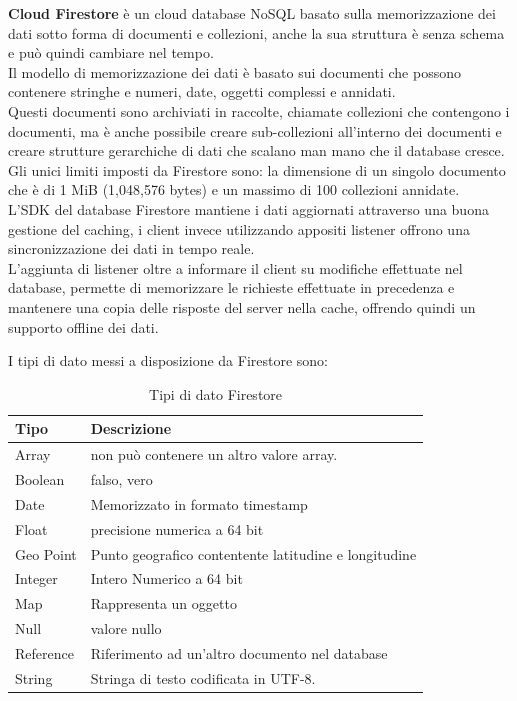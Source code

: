 \textbf{Cloud Firestore} è un cloud database NoSQL basato sulla memorizzazione dei dati sotto forma di documenti e collezioni, anche la sua struttura è senza schema e può quindi cambiare nel tempo.\\
Il modello di memorizzazione dei dati è basato sui documenti che possono contenere  stringhe e numeri, date, oggetti complessi e annidati.\\
Questi documenti sono archiviati in raccolte, chiamate collezioni che contengono i documenti, ma è anche possibile creare sub-collezioni all'interno dei documenti e creare strutture gerarchiche di dati che scalano man mano che il database cresce.\\
Gli unici limiti imposti da Firestore sono: la dimensione di un singolo documento che è di 1 MiB (1,048,576 bytes) e un massimo di 100 collezioni annidate.\\
L'SDK del database Firestore mantiene i dati aggiornati attraverso una buona gestione del caching, i client invece utilizzando appositi listener offrono una sincronizzazione dei dati in tempo reale.\\
L'aggiunta di listener oltre a informare il client su modifiche effettuate nel database, permette di memorizzare le richieste effettuate in precedenza e mantenere una copia delle risposte del server nella cache, offrendo quindi un supporto offline dei dati.

I tipi di dato messi a disposizione da Firestore sono:
\begin{table}[h]
\begin{center}
\begin{tabular}{|p{3cm}|p{10cm}|}
    \hline
\textbf{Tipo} & \textbf{Descrizione} \\ \hline
Array & non può contenere un altro valore array. \\ \hline
Boolean & falso, vero  \\ \hline
Date & Memorizzato in formato timestamp \\ \hline
Float & precisione numerica a 64 bit \\ \hline
Geo Point & Punto geografico contentente latitudine e longitudine \\ \hline
Integer & Intero Numerico a 64 bit \\ \hline
Map & Rappresenta un oggetto  \\ \hline
Null & valore nullo \\ \hline
Reference & Riferimento ad un'altro documento nel database  \\ \hline
String & Stringa di testo codificata in UTF-8.\\
\hline
\end{tabular}
\caption[Dati Firestore]{Tipi di dato Firestore}\label{tab:Firestore Tipi di dato}
\end{center}
\end{table}

